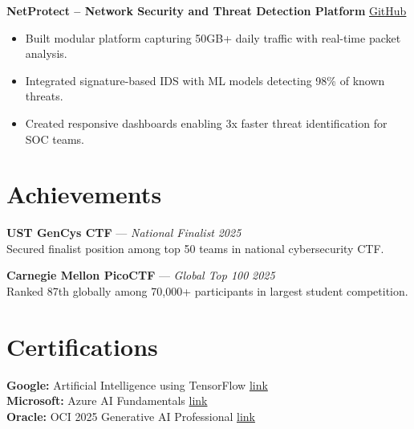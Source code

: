 \documentclass[a4paper,10pt]{article}
\begin{document}
\textbf{NetProtect – Network Security and Threat Detection Platform} \hfill \href{https://github.com/Ome9/NetProtect}{GitHub}
\vspace{6pt}
\begin{itemize}
    \item Built modular platform capturing 50GB+ daily traffic with real-time packet analysis.
    \item Integrated signature-based IDS with ML models detecting 98\% of known threats.
    \item Created responsive dashboards enabling 3x faster threat identification for SOC teams.
\end{itemize}

\section{Achievements}
\vspace{4pt}
\textbf{UST GenCys CTF} — \textit{National Finalist} \hfill \textit{2025}\\
Secured finalist position among top 50 teams in national cybersecurity CTF.
\vspace{10pt}

\textbf{Carnegie Mellon PicoCTF} — \textit{Global Top 100} \hfill \textit{2025}\\
Ranked 87th globally among 70,000+ participants in largest student competition.

\section{Certifications}
\vspace{4pt}
\textbf{Google:} Artificial Intelligence using TensorFlow \hfill \href{https://drive.google.com/file/d/1x9bzsKFt6Vh4PIY0GukX6EKBPkh4GONf/view?usp=drive_link}{link}\\
\textbf{Microsoft:} Azure AI Fundamentals \hfill \href{https://drive.google.com/file/d/1iVqL7rlVRdTd4fY1ey_zNzZVXFid5dBL/view?usp=drive_link}{link}\\
\textbf{Oracle:} OCI 2025 Generative AI Professional \hfill \href{https://drive.google.com/file/d/1U4Rq1T7V1OTNx_2xALiqgn7UMsTH-kFP/view?usp=drive_link}{link}\\
\end{document}
